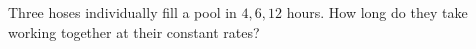 Three hoses individually fill a pool in $4,6,12$ hours. How long do they take working together at their constant rates?

